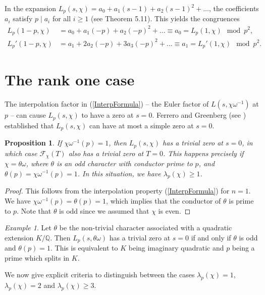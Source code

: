 \documentclass[pdflatex,sn-mathphys-num]{sn-jnl}%
\theoremstyle{plain}
\newtheorem{prop}[thm]{Proposition}
\theoremstyle{definition}
\theoremstyle{remark}
\newtheorem*{exm*}{Example}
\numberwithin{equation}{section}
\newcommand{\QQ}{\mathbb{Q}}
\begin{document}
In the expansion $L_p(s,\chi) = a_0 + a_1 (s-1) + a_2 (s-1)^2 + \dots$, the coefficients $a_i$ satisfy
$p \mid a_i$ for all $i\geq 1$ (see \cite{Wa2} Theorem 5.11). This yields the congruences
\begin{align}
L_p(1-p, \chi) & = a_0 + a_1 (-p) + a_2 (-p)^2 + \dots \equiv a_0 = L_p(1,\chi) \mod p^2 ,
 \label{FDDD0} \\
 L_p'(1-p, \chi) & = a_1 + 2 a_2 (-p) + 3 a_3 (-p)^2 + \dots \equiv a_1 = L_p'(1, \chi) \mod p^2 .
\label{GDDD0} 
\end{align}


\section{The rank one case}\label{Sect3}

The interpolation factor in (\ref{InterpFormula}) -- the Euler factor  of $L(s, \chi \omega^{-1})$ at $p$ --  can cause $L_p(s,\chi)$ to have a zero at $s=0$. Ferrero and Greenberg (see  \cite{FeGr}) established  that $L_p(s,\chi)$ can have at most a simple zero at $s=0$.

\begin{prop}
If $\chi\omega^{-1}(p)=1$, then $L_p(s,\chi)$  has a trivial zero at $s=0$, in which case $\mathcal{F}_{\chi}(T)$ also has a trivial zero at $T=0$. This happens
precisely  if $\chi = \theta \omega$, where $\theta$ is an odd character with conductor prime to $p$, and $\theta(p) = \chi \omega^{-1} (p) =1$.
In this situation, we have $\lambda_p(\chi) \geq 1$.
\label{condzero}
\end{prop}
\begin{proof} This follows from the interpolation property (\ref{InterpFormula}) for $n=1$. We have $ \chi \omega^{-1} (p) =\theta(p)=1$, which implies that the conductor of $\theta$ is prime to $p$. Note that $\theta$ is odd since we assumed that $\chi$ is even.
\end{proof}

\begin{exm*} Let $\theta$ be the non-trivial character associated with a quadratic extension $K/\QQ$. Then $L_p(s,\theta \omega)$ has a trivial zero at $s=0$ if and only if $\theta$ is odd and $\theta(p)=1$. This is equivalent to $K$ being imaginary quadratic and $p$ being a prime which splits in $K$.
\end{exm*}



We now give explicit criteria to distinguish between the cases $\lambda_p(\chi) = 1$, $\lambda_p(\chi) =2$ and $\lambda_p(\chi) \geq 3$.
\end{document}
